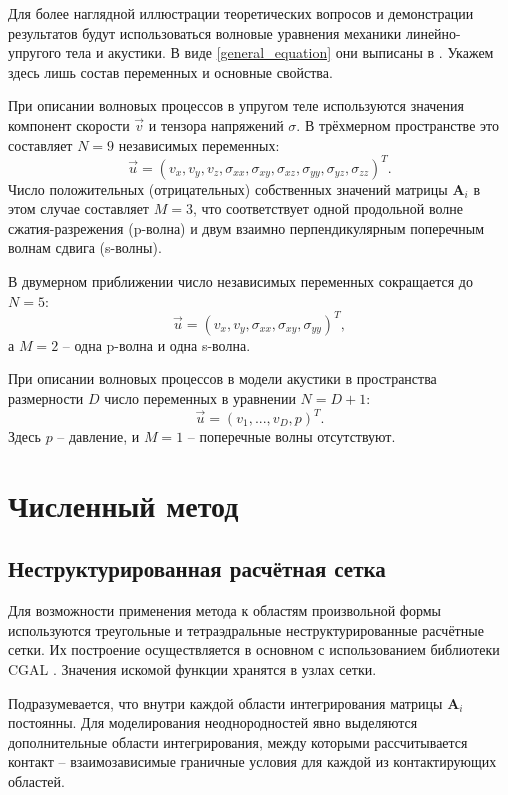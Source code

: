 \documentclass[a4paper]{article}
\numberwithin{equation}{section}
\begin{document}
Для более наглядной иллюстрации теоретических вопросов и 
демонстрации результатов будут использоваться волновые уравнения 
механики линейно-упругого тела и акустики. В виде \eqref{general_equation}
они выписаны в \cite{chelnokov}. Укажем здесь лишь состав переменных 
и основные свойства. 

При описании волновых процессов в упругом теле используются значения 
компонент скорости $\vec{v}$ и тензора напряжений $\sigma$.
В трёхмерном пространстве это составляет $N = 9$ независимых переменных:
\begin{equation}
	\vec{u} = (v_x,v_y,v_z,\sigma_{xx},\sigma_{xy},\sigma_{xz},\sigma_{yy},\sigma_{yz},\sigma_{zz})^{T}.
\end{equation}
Число положительных (отрицательных) собственных значений матрицы $\mathbf{A}_i$ 
в этом случае составляет $M = 3$, что соответствует 
одной продольной волне сжатия-разрежения (p-волна) и 
двум взаимно перпендикулярным поперечным волнам сдвига (s-волны).

В двумерном приближении число независимых переменных сокращается до $N = 5$:
\begin{equation}
	\vec{u} = (v_x,v_y,\sigma_{xx},\sigma_{xy},\sigma_{yy})^{T},
\end{equation}
а $M = 2$ -- одна p-волна и одна s-волна.

При описании волновых процессов в модели акустики 
в пространства размерности $D$ число переменных в уравнении $N = D + 1$:
\begin{equation}
	\vec{u} = (v_1, ..., v_D, p)^T.
\end{equation}
Здесь $p$ -- давление, и $M = 1$ -- поперечные волны отсутствуют.


\section{Численный метод}
\subsection{Неструктурированная расчётная сетка}
Для возможности применения метода к областям произвольной формы используются
треугольные и тетраэдральные неструктурированные расчётные сетки. 
Их построение осуществляется в основном с использованием 
библиотеки CGAL \cite{cgal}. 
Значения искомой функции хранятся в узлах сетки. 

Подразумевается, что внутри каждой области интегрирования матрицы $\mathbf{A}_i$
постоянны. Для моделирования неоднородностей явно выделяются дополнительные
области интегрирования, между которыми рассчитывается контакт -- взаимозависимые
граничные условия для каждой из контактирующих областей.
\end{document}
